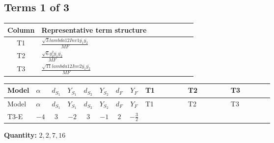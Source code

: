 \documentclass[8pt]{article}
\begin{document}
\begin{landscape}
\subsection*{Terms 1 of 3}
\begin{center}
\begin{tabular}{@{}c >{\raggedright\arraybackslash}p{0.82\linewidth}@{}}
\toprule
Column & Representative term structure \\
\midrule
T1 & \(\displaystyle \frac{\sqrt{3} lambda12Inv1 \overline{y_{1}} \overline{y_{2}}}{MF}\) \\
\midrule
T2 & \(\displaystyle \frac{\sqrt{6} g_{2}^{2} \overline{y_{1}} \overline{y_{2}}}{MF}\) \\
\midrule
T3 & \(\displaystyle \frac{\sqrt{11} lambda12Inv2 \overline{y_{1}} \overline{y_{2}}}{MF}\) \\
\midrule
\bottomrule
\end{tabular}
\end{center}
\smallskip
\tiny
\begin{longtable}{@{}llcccccc >{\raggedright\arraybackslash}p{0.21\linewidth} >{\raggedright\arraybackslash}p{0.21\linewidth} >{\raggedright\arraybackslash}p{0.21\linewidth}@{}}
\toprule
Model & $\alpha$ & $d_{S_1}$ & $Y_{S_1}$ & $d_{S_2}$ & $Y_{S_2}$ & $d_F$ & $Y_F$ & T1 & T2 & T3 \\
\midrule
\endfirsthead
\toprule
Model & $\alpha$ & $d_{S_1}$ & $Y_{S_1}$ & $d_{S_2}$ & $Y_{S_2}$ & $d_F$ & $Y_F$ & T1 & T2 & T3 \\
\midrule
\endhead
T3-E & $-4$ & $3$ & $-2$ & $3$ & $-1$ & $2$ & $-\frac{3}{2}$ & \scriptsize\adjustbox{max width=\linewidth}{$\begin{gathered} - \frac{\sqrt{3} lambda12Inv1 \overline{y_{1}} \overline{y_{2}}}{6 MF}\end{gathered}$} & \scriptsize\adjustbox{max width=\linewidth}{$\begin{gathered} \frac{\sqrt{6} g_{2}^{2} \overline{y_{1}} \overline{y_{2}}}{3 MF}\end{gathered}$} & \scriptsize\adjustbox{max width=\linewidth}{$\begin{gathered} \frac{3 \sqrt{11} lambda12Inv2 \overline{y_{1}} \overline{y_{2}}}{22 MF}\end{gathered}$} \\
\midrule
\bottomrule
\end{longtable}
\clearpage
\noindent\textbf{Quantity: }$\mathrm{2,2,7,16}$\par\smallskip

\end{landscape}
\end{document}

